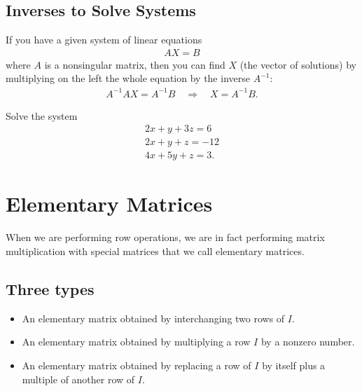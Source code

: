 \documentclass[12pt,a4paper]{article}
\newcounter{example}[section]
\begin{document}
\newpage

\subsection{Inverses to Solve Systems}
If you have a given system of linear equations
	\begin{align*}
	AX = B
	\end{align*}
where $A$ is a nonsingular matrix, then you can find $X$ (the vector of solutions) by multiplying on the left the whole equation by the inverse $A^{-1}$:
	\begin{align*}
	A^{-1} A X = A^{-1} B  \quad \Rightarrow \quad X = A^{-1} B .
	\end{align*}

\begin{example}
Solve the system
	\begin{align*}
	2x + y + 3z = 6 \\
	2x + y + z = -12 \\
	4x + 5y + z = 3 .
	\end{align*}
\end{example}

\newpage


\section{Elementary Matrices}
When we are performing row operations, we are in fact performing matrix multiplication with special matrices that we call elementary matrices.

\subsection{Three types}

	\begin{itemize}
	\item An elementary matrix obtained by interchanging two rows of $I$.
	\item An elementary matrix obtained by multiplying a row $I$ by a nonzero number.
	\item An elementary matrix obtained by replacing a row of $I$ by itself plus a multiple of another row of $I$.
	\end{itemize}
\end{document}
